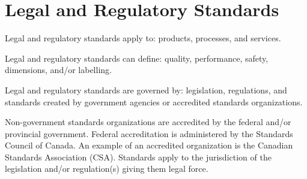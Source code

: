 \documentclass{tech-spec}
\begin{document}
  \section*{Legal and Regulatory Standards}
  \begin{parnumbers}
    Legal and regulatory standards apply to: products, processes, and services.

    Legal and regulatory standards can define: quality, performance, safety, dimensions, and/or labelling.

    Legal and regulatory standards are governed by: legislation, regulations, and standards created by government agencies or accredited standards organizations.

    Non-government standards organizations are accredited by the federal and/or provincial government. Federal accreditation is administered by the Standards Council of Canada. An example of an accredited organization is the Canadian Standards Association (CSA). Standards apply to the jurisdiction of the legislation and/or regulation(s) giving them legal force.
  \end{parnumbers}
\end{document}
